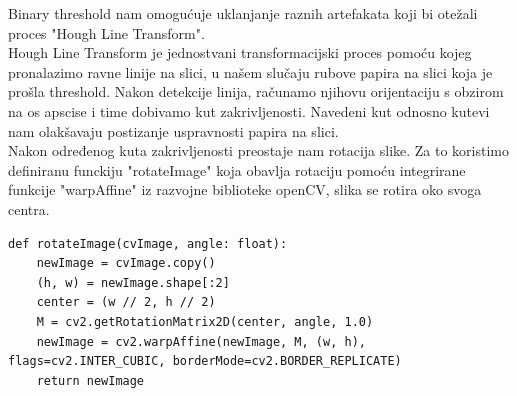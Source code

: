 \documentclass{article}
\begin{document}
Binary threshold nam omogućuje uklanjanje raznih artefakata koji bi otežali proces "Hough Line Transform".\\

Hough Line Transform je jednostvani transformacijski proces pomoću kojeg pronalazimo ravne linije na slici, u našem slučaju rubove papira na slici koja je prošla threshold. Nakon detekcije linija, računamo njihovu orijentaciju s obzirom na os apscise i time dobivamo kut zakrivljenosti. Navedeni kut odnosno kutevi nam olakšavaju postizanje uspravnosti papira na slici.\\

Nakon određenog kuta zakrivljenosti preostaje nam rotacija slike. Za to koristimo definiranu funckiju "rotateImage" koja obavlja rotaciju pomoću integrirane funkcije "warpAffine" iz razvojne biblioteke openCV, slika se rotira oko svoga centra. %
\begin{lstlisting}
def rotateImage(cvImage, angle: float):
    newImage = cvImage.copy()
    (h, w) = newImage.shape[:2]
    center = (w // 2, h // 2)
    M = cv2.getRotationMatrix2D(center, angle, 1.0)
    newImage = cv2.warpAffine(newImage, M, (w, h), flags=cv2.INTER_CUBIC, borderMode=cv2.BORDER_REPLICATE)
    return newImage
\end{lstlisting}
\end{document}
